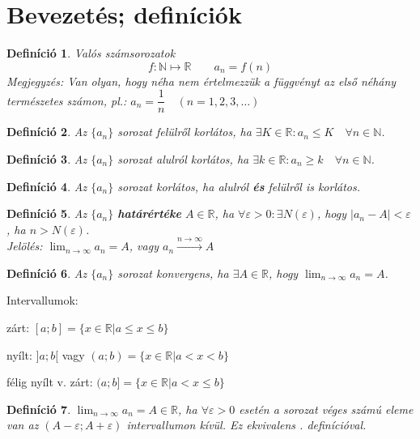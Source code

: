 \documentclass[a4paper,12pt,twoside]{book}
\newtheorem{defi}{Definíció}[chapter]
\theoremstyle{break}
\theoremstyle{plain}
\begin{document}
\section{Bevezetés; definíciók}

\begin{defi}
Valós számsorozatok
\[f: \mathbb{N} \mapsto \mathbb{R} \qquad a_n = f(n)\]
Megjegyzés: Van olyan, hogy néha nem értelmezzük a függvényt az első néhány természetes számon, pl.: $a_n = \dfrac{1}{n} \quad (n=1,2,3,\ldots)$
\end{defi}

\begin{defi}Az $\{a_n\}$ sorozat felülről korlátos, ha $\exists K\in\mathbb{R}:a_n \leqslant K \quad \forall n\in\mathbb{N}$.\end{defi}
\begin{defi}Az $\{a_n\}$ sorozat alulról korlátos, ha $\exists k\in\mathbb{R}:a_n \geqslant k \quad \forall n\in\mathbb{N}$.\end{defi}
\begin{defi}Az $\{a_n\}$ sorozat korlátos, ha alulról \textbf{és} felülről is korlátos.\end{defi}

\begin{defi}\label{HatarertekDefi1}Az $\{a_n\}$ \textbf{határértéke} $A\in\mathbb{R}$, ha $\forall\varepsilon>0:\exists N(\varepsilon)$, hogy $|a_n-A|<\varepsilon$, ha $n>N(\varepsilon)$.\\
Jelölés: $\displaystyle{\lim_{n\to\infty}a_n = A}$, vagy $a_n \xrightarrow{n\to\infty} A$
\end{defi}

\begin{defi}Az $\{a_n\}$ sorozat konvergens, ha $\exists A\in\mathbb{R}$, hogy $\displaystyle{\lim_{n\to\infty}a_n = A}$.\end{defi}

Intervallumok:
\begin{itemize*}
 \item zárt: $[a;b]=\{x\in\mathbb{R}|a\leqslant x\leqslant b\}$
 \item nyílt: $]a;b[$ vagy $(a;b)=\{x\in\mathbb{R}|a < x < b\}$
 \item félig nyílt v. zárt: $(a;b]=\{x\in\mathbb{R}|a < x \leqslant b\}$ 
\end{itemize*}

\begin{defi}
$\displaystyle \lim_{n\to\infty}a_n=A\in\mathbb{R}$, ha $\forall\varepsilon > 0$ esetén a sorozat véges számú eleme van az $(A-\varepsilon; A+\varepsilon)$ intervallumon kívül. Ez ekvivalens . definícióval.
\end{defi}
\end{document}
